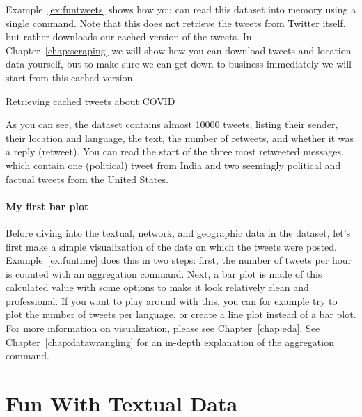 Example~\ref{ex:funtweets} shows how you can read this dataset into memory using a single command.
Note that this does not retrieve the tweets from Twitter itself, but rather downloads
our cached version of the tweets.
In Chapter~\ref{chap:scraping} we will show how you can download tweets and location data yourself, but to make sure
we can get down to business immediately we will start from this cached version. 

\begin{ccsexample}
\caption{Retrieving cached tweets about COVID}\label{ex:funtweets}
\end{ccsexample}

As you can see, the dataset contains almost 10000 tweets, listing their
sender, their location and language, the text, the number of retweets, and whether it was a reply (retweet).
You can read the start of the three most retweeted messages, which contain one (political) tweet from India
and two seemingly political and factual tweets from the United States.

\paragraph{My first bar plot} Before diving into the textual, network, and geographic data in the dataset,
let's first make a simple visualization of the date on which the tweets were posted.
Example~\ref{ex:funtime} does this in two steps:
first, the number of tweets per hour is counted with an aggregation command.
Next, a bar plot is made of this calculated value with some options to make it look relatively clean and professional.
If you want to play around with this, you can for example try to plot the number of tweets per language,
or create a line plot instead of a bar plot. 
For more information on visualization, please see Chapter~\ref{chap:eda}.
See Chapter~\ref{chap:datawrangling} for an in-depth explanation of the aggregation command. 


\section{Fun With Textual Data}\label{sec:funtext}

